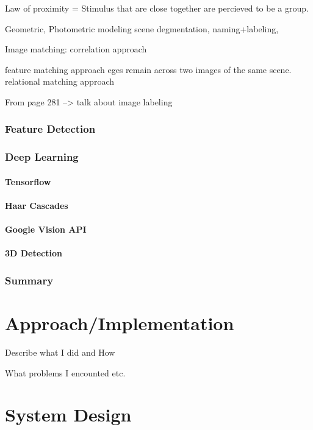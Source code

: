 \documentclass{mproj}
\begin{document}
Law of proximity = Stimulus that are close together are percieved to be a group.

Geometric, Photometric modeling scene degmentation, naming+labeling,

Image matching:
correlation approach
 
feature matching approach
eges remain across two images of the same scene. 
relational matching approach

From page 281 --> talk about image labeling



\subsection{Feature Detection}
\subsection{Deep Learning}
\subsubsection{Tensorflow}
\subsubsection{Haar Cascades}
\subsubsection{Google Vision API}
\subsubsection{3D Detection}
\subsection{Summary}





\chapter{Approach/Implementation}
Describe what I did and How

What problems I encounted etc.

\chapter{System Design}
\end{document}
